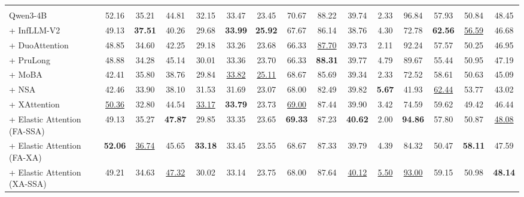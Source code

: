 \begin{table}[t]
{\begin{tabular}{l|ccccccccccccc|c}
\rowcolor{blue!10}
\multicolumn{15}{c}{\textbf{Qwen3-4B backbone model}} \\
\arrayrulecolor{black!20}\midrule
Qwen3-4B & 52.16 & 35.21 & 44.81 & 32.15 & 33.47 & 23.45 & 70.67 & 88.22 & 39.74 & 2.33 & 96.84 & 57.93 & 50.84 & 48.45 \\
+ InfLLM-V2 & 49.13 & \textbf{37.51} & 40.26 & 29.68 & \textbf{33.99} & \textbf{25.92} & 67.67 & 86.14 & 38.76 & 4.30 & 72.78 & \textbf{62.56} & \underline{56.59} & 46.68 \\
+ DuoAttention & 48.85 & 34.60 & 42.25 & 29.18 & 33.26 & 23.68 & 66.33 & \underline{87.70} & 39.73 & 2.11 & 92.24 & 57.57 & 50.25 & 46.95 \\
+ PruLong & 48.88 & 34.28 & 45.14 & 30.01 & 33.36 & 23.70 & 66.33 & \textbf{88.31} & 39.77 & 4.79 & 89.67 & 55.44 & 50.95 & 47.19 \\
+ MoBA & 42.41 & 35.80 & 38.76 & 29.84 & \underline{33.82} & \underline{25.11} & 68.67 & 85.69 & 39.34 & 2.33 & 72.52 & 58.61 & 50.63 & 45.09 \\
+ NSA & 42.46 & 33.90 & 38.10 & 31.53 & 31.69 & 23.07 & 68.00 & 82.49 & 39.82 & \textbf{5.67} & 41.93 & \underline{62.44} & 53.77 & 43.02 \\
+ XAttention & \underline{50.36} & 32.80 & 44.54 & \underline{33.17} & \textbf{33.79} & 23.73 & \underline{69.00} & 87.44 & 39.90 & 3.42 & 74.59 & 59.62 & 49.42 & 46.44 \\
\arrayrulecolor{black!40}\midrule
+ Elastic Attention (FA-SSA) & 49.13 & 35.27 & \textbf{47.87} & 29.85 & 33.35 & 23.65 & \textbf{69.33} & 87.23 & \textbf{40.62} & 2.00 & \textbf{94.86} & 57.80 & 50.87 & \underline{48.08} \\
+ Elastic Attention (FA-XA) & \textbf{52.06} & \underline{36.74} & 45.65 & \textbf{33.18} & 33.45 & 23.55 & 68.67 & 87.33 & 39.79 & 4.39 & 84.32 & 50.47 & \textbf{58.11} & 47.59 \\
+ Elastic Attention (XA-SSA) & 49.21 & 34.63 & \underline{47.32} & 30.02 & 33.14 & 23.75 & 68.00 & 87.64 & \underline{40.12} & \underline{5.50} & \underline{93.00} & 59.15 & 50.98 & \textbf{48.14} \\


\end{tabular}}
\end{table}
